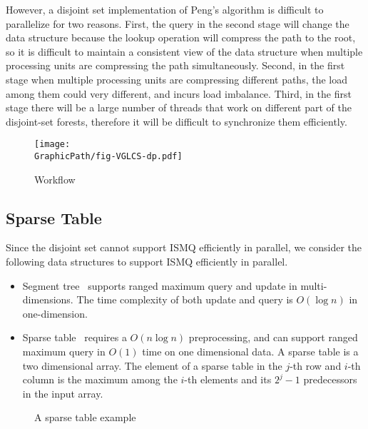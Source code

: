 However, a disjoint set implementation of Peng's algorithm is difficult
to parallelize for two reasons.  First, the query in the second stage
will change the data structure because the lookup operation will
compress the path to the root, so it is difficult to maintain a
consistent view of the data structure when multiple processing units are
compressing the path simultaneously.  Second, in the first stage when
multiple processing units are compressing different paths, the load
among them could very different, and incurs load imbalance.  Third, in
the first stage there will be a large number of threads that work on
different part of the disjoint-set forests, therefore it will be
difficult to synchronize them efficiently.

\begin{figure}[!thb]
  \centering
  \texttt{[image: \\GraphicPath/fig-VGLCS-dp.pdf]}
  \label{fig:fig-VGLCS-dp}
  \caption{Workflow}
\end{figure}

\subsection{Sparse Table}

Since the disjoint set cannot support ISMQ efficiently in parallel, we
consider the following data structures to support ISMQ efficiently in
parallel.

\begin{itemize}
  \item Segment tree~\cite{berg2000computational} supports ranged
    maximum query and update in multi-dimensions.  The time complexity
    of both update and query is $O(\log n)$ in one-dimension.
  \item Sparse table~\cite{Berkman1993RecursiveSP} requires a $O(n
    \log n)$ preprocessing, and can support ranged maximum query in
    $O(1)$ time on one dimensional data.  A sparse table is a two
    dimensional array.  The element of a sparse table in the $j$-th
    row and $i$-th column is the maximum among the $i$-th elements
    and its $2^j - 1$ predecessors in the input array.
\end{itemize}

\begin{figure}[!thb]
  \centering {} 
  \caption{A sparse table example}
  \label{fig:interval-decomposition}
\end{figure}

